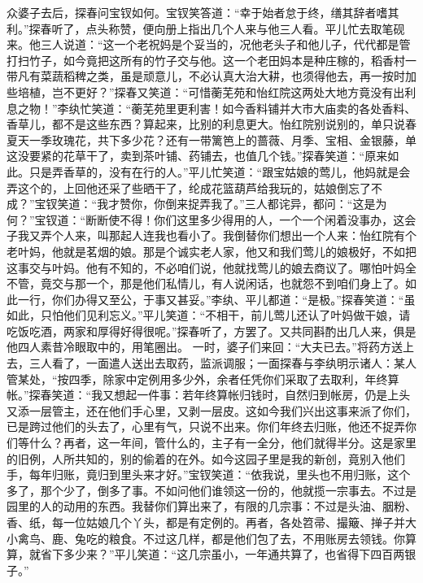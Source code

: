 \documentclass[12pt,oneside]{book}
\begin{document}
众婆子去后，探春问宝钗如何。宝钗笑答道：“幸于始者怠于终，缮其辞者嗜其利。”探春听了，点头称赞，便向册上指出几个人来与他三人看。平儿忙去取笔砚来。他三人说道：“这一个老祝妈是个妥当的，况他老头子和他儿子，代代都是管打扫竹子，如今竟把这所有的竹子交与他。这一个老田妈本是种庄稼的，稻香村一带凡有菜蔬稻稗之类，虽是顽意儿，不必认真大治大耕，也须得他去，再一按时加些培植，岂不更好？”探春又笑道：“可惜蘅芜苑和怡红院这两处大地方竟没有出利息之物！”李纨忙笑道：“蘅芜苑里更利害！如今香料铺并大市大庙卖的各处香料、香草儿，都不是这些东西？算起来，比别的利息更大。怡红院别说别的，单只说春夏天一季玫瑰花，共下多少花？还有一带篱笆上的蔷薇、月季、宝相、金银藤，单这没要紧的花草干了，卖到茶叶铺、药铺去，也值几个钱。”探春笑道：“原来如此。只是弄香草的，没有在行的人。”平儿忙笑道：“跟宝姑娘的莺儿，他妈就是会弄这个的，上回他还采了些晒干了，纶成花篮葫芦给我玩的，姑娘倒忘了不成？”宝钗笑道：“我才赞你，你倒来捉弄我了。”三人都诧异，都问：“这是为何？”宝钗道：“断断使不得！你们这里多少得用的人，一个一个闲着没事办，这会子我又弄个人来，叫那起人连我也看小了。我倒替你们想出一个人来：怡红院有个老叶妈，他就是茗烟的娘。那是个诚实老人家，他又和我们莺儿的娘极好，不如把这事交与叶妈。他有不知的，不必咱们说，他就找莺儿的娘去商议了。哪怕叶妈全不管，竟交与那一个，那是他们私情儿，有人说闲话，也就怨不到咱们身上了。如此一行，你们办得又至公，于事又甚妥。”李纨、平儿都道：“是极。”探春笑道：“虽如此，只怕他们见利忘义。”平儿笑道：“不相干，前儿莺儿还认了叶妈做干娘，请吃饭吃酒，两家和厚得好得很呢。”探春听了，方罢了。又共同斟酌出几人来，俱是他四人素昔冷眼取中的，用笔圈出。
一时，婆子们来回：“大夫已去。”将药方送上去，三人看了，一面遣人送出去取药，监派调服；一面探春与李纨明示诸人：某人管某处，“按四季，除家中定例用多少外，余者任凭你们采取了去取利，年终算帐。”探春笑道：“我又想起一件事：若年终算帐归钱时，自然归到帐房，仍是上头又添一层管主，还在他们手心里，又剥一层皮。这如今我们兴出这事来派了你们，已是跨过他们的头去了，心里有气，只说不出来。你们年终去归账，他还不捉弄你们等什么？再者，这一年间，管什么的，主子有一全分，他们就得半分。这是家里的旧例，人所共知的，别的偷着的在外。如今这园子里是我的新创，竟别入他们手，每年归账，竟归到里头来才好。”宝钗笑道：“依我说，里头也不用归账，这个多了，那个少了，倒多了事。不如问他们谁领这一份的，他就揽一宗事去。不过是园里的人的动用的东西。我替你们算出来了，有限的几宗事：不过是头油、胭粉、香、纸，每一位姑娘几个丫头，都是有定例的。再者，各处笤帚、撮簸、掸子并大小禽鸟、鹿、兔吃的粮食。不过这几样，都是他们包了去，不用账房去领钱。你算算，就省下多少来？”平儿笑道：“这几宗虽小，一年通共算了，也省得下四百两银子。”
\end{document}
